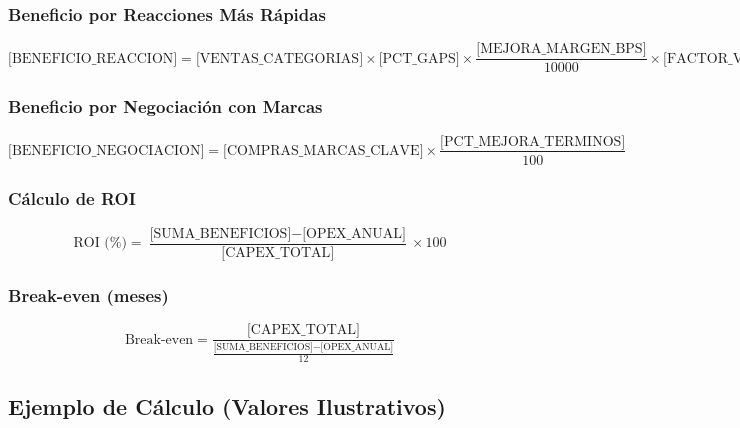 \documentclass[12pt,a4paper]{article}
\begin{document}
\subsubsection*{Beneficio por Reacciones Más Rápidas}
\begin{equation}
\text{{[}BENEFICIO\_REACCION{]}} = \text{{[}VENTAS\_CATEGORIAS{]}} \times \text{{[}PCT\_GAPS{]}} \times \frac{\text{{[}MEJORA\_MARGEN\_BPS{]}}}{10000} \times \text{{[}FACTOR\_VELOCIDAD{]}}
\end{equation}

\subsubsection*{Beneficio por Negociación con Marcas}
\begin{equation}
\text{{[}BENEFICIO\_NEGOCIACION{]}} = \text{{[}COMPRAS\_MARCAS\_CLAVE{]}} \times \frac{\text{{[}PCT\_MEJORA\_TERMINOS{]}}}{100}
\end{equation}

\subsubsection*{Cálculo de ROI}
\begin{equation}
\text{ROI (\%)} = \frac{\text{{[}SUMA\_BENEFICIOS{]}} - \text{{[}OPEX\_ANUAL{]}}}{\text{{[}CAPEX\_TOTAL{]}}} \times 100
\end{equation}

\subsubsection*{Break-even (meses)}
\begin{equation}
\text{Break-even} = \frac{\text{{[}CAPEX\_TOTAL{]}}}{\frac{\text{{[}SUMA\_BENEFICIOS{]}} - \text{{[}OPEX\_ANUAL{]}}}{12}}
\end{equation}

\subsection{Ejemplo de Cálculo (Valores Ilustrativos)}
\end{document}
